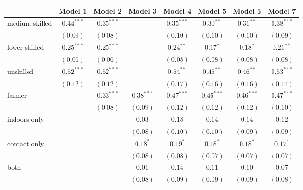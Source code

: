 
\begin{table}
\begin{center}
\begin{tabular}{l c c c c c c c}
\hline
 & Model 1 & Model 2 & Model 3 & Model 4 & Model 5 & Model 6 & Model 7 \\
\hline
medium skilled & $0.44^{***}$ & $0.35^{***}$ &              & $0.35^{***}$ & $0.30^{**}$   & $0.31^{**}$   & $0.38^{***}$  \\
               & $(0.09)$     & $(0.08)$     &              & $(0.10)$     & $(0.10)$      & $(0.10)$      & $(0.09)$      \\
lower skilled  & $0.25^{***}$ & $0.25^{***}$ &              & $0.24^{**}$  & $0.17^{*}$    & $0.18^{*}$    & $0.21^{**}$   \\
               & $(0.06)$     & $(0.06)$     &              & $(0.08)$     & $(0.08)$      & $(0.08)$      & $(0.08)$      \\
unskilled      & $0.52^{***}$ & $0.52^{***}$ &              & $0.54^{**}$  & $0.45^{**}$   & $0.46^{**}$   & $0.53^{***}$  \\
               & $(0.12)$     & $(0.12)$     &              & $(0.17)$     & $(0.16)$      & $(0.16)$      & $(0.14)$      \\
farmer         &              & $0.33^{***}$ & $0.38^{***}$ & $0.47^{***}$ & $0.46^{***}$  & $0.46^{***}$  & $0.47^{***}$  \\
               &              & $(0.08)$     & $(0.09)$     & $(0.12)$     & $(0.12)$      & $(0.12)$      & $(0.10)$      \\
indoors only   &              &              & $0.03$       & $0.18$       & $0.14$        & $0.14$        & $0.12$        \\
               &              &              & $(0.08)$     & $(0.10)$     & $(0.10)$      & $(0.09)$      & $(0.09)$      \\
contact only   &              &              & $0.18^{*}$   & $0.19^{*}$   & $0.18^{*}$    & $0.18^{*}$    & $0.17^{*}$    \\
               &              &              & $(0.08)$     & $(0.08)$     & $(0.07)$      & $(0.07)$      & $(0.07)$      \\
both           &              &              & $0.01$       & $0.14$       & $0.11$        & $0.10$        & $0.07$        \\
               &              &              & $(0.08)$     & $(0.09)$     & $(0.09)$      & $(0.09)$      & $(0.08)$      \\

\end{tabular}
\end{center}
\end{table}

